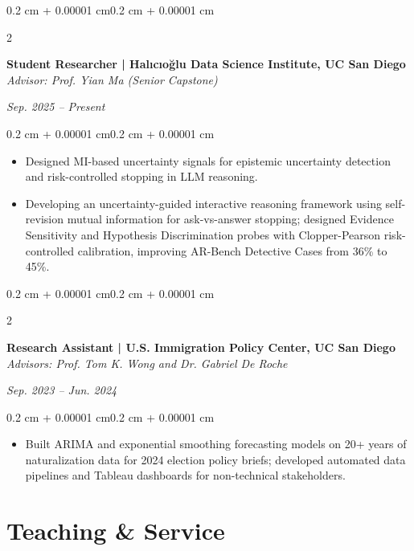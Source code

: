 \documentclass[10pt, letterpaper]{article}
\newenvironment{highlights}{
    \begin{itemize}[
        topsep=0.10 cm,
        parsep=0.10 cm,
        partopsep=0pt,
        itemsep=0pt,
        leftmargin=0.4 cm + 10pt
    ]
}{\end{itemize}}
\newenvironment{onecolentry}{
    \begin{adjustwidth}{0.2 cm + 0.00001 cm}{0.2 cm + 0.00001 cm}
}{\end{adjustwidth}}
\newenvironment{twocolentry}[2][]{
    \onecolentry
    \def\secondColumn{#2}
    \setcolumnwidth{\fill, 4.5 cm}
    \begin{paracol}{2}
}{
    \switchcolumn \raggedleft \secondColumn
    \end{paracol}
    \endonecolentry
}
\begin{document}
    \begin{twocolentry}{\textit{Sep. 2025 -- Present}}
        \textbf{Student Researcher | Halıcıo\u{g}lu Data Science Institute, UC San Diego}\\
        \textit{Advisor: Prof. Yian Ma (Senior Capstone)}
    \end{twocolentry}
    \vspace{0.10 cm}
    \begin{onecolentry}
        \begin{highlights}
            \item Designed MI-based uncertainty signals for epistemic uncertainty detection and risk-controlled stopping in LLM reasoning.
            \item Developing an uncertainty-guided interactive reasoning framework using self-revision mutual information for ask-vs-answer stopping; designed Evidence Sensitivity and Hypothesis Discrimination probes with Clopper-Pearson risk-controlled calibration, improving AR-Bench Detective Cases from 36\% to 45\%.
        \end{highlights}
    \end{onecolentry}
    \vspace{0.20 cm}

    \begin{twocolentry}{\textit{Sep. 2023 -- Jun. 2024}}
        \textbf{Research Assistant | U.S. Immigration Policy Center, UC San Diego}\\
        \textit{Advisors: Prof. Tom K. Wong and Dr. Gabriel De Roche}
    \end{twocolentry}
    \vspace{0.10 cm}
    \begin{onecolentry}
        \begin{highlights}
            \item Built ARIMA and exponential smoothing forecasting models on 20+ years of naturalization data for 2024 election policy briefs; developed automated data pipelines and Tableau dashboards for non-technical stakeholders.
        \end{highlights}
    \end{onecolentry}

    \section{Teaching \& Service}
\end{document}
